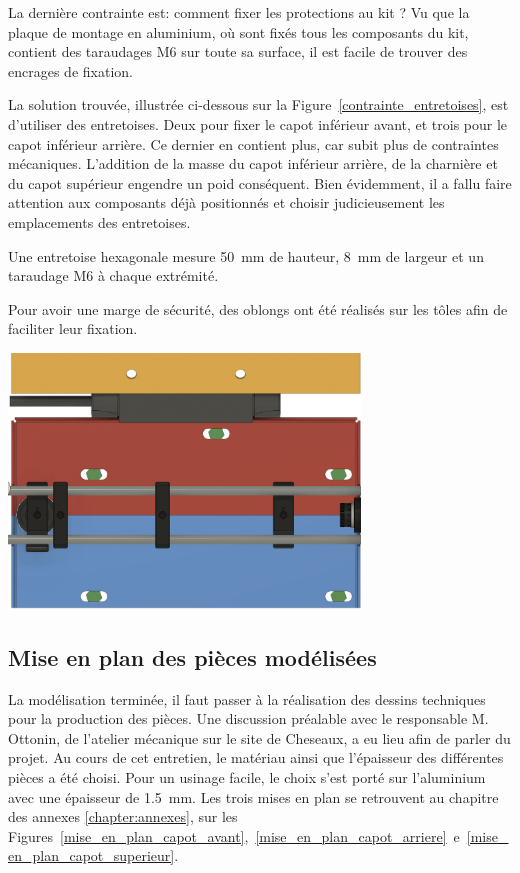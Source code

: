 \begin{minipage}{\textwidth}
    La dernière contrainte est: comment fixer les protections au kit ? Vu que la plaque de montage en aluminium, où sont fixés tous les composants du kit, contient des taraudages M6 sur toute sa surface, il est facile de trouver des encrages de fixation.

    La solution trouvée, illustrée ci-dessous sur la Figure~\ref{contrainte_entretoises}, est d'utiliser des entretoises. Deux pour fixer le capot inférieur avant, et trois pour le capot inférieur arrière. Ce dernier en contient plus, car subit plus de contraintes mécaniques. L'addition de la masse du capot inférieur arrière, de la charnière et du capot supérieur engendre un poid conséquent. Bien évidemment, il a fallu faire attention aux composants déjà positionnés et choisir judicieusement les emplacements des entretoises.

    Une entretoise hexagonale mesure 50~mm de hauteur, 8~mm de largeur et un taraudage M6 à chaque extrémité.

    Pour avoir une marge de sécurité, des oblongs ont été réalisés sur les tôles afin de faciliter leur fixation.
    \vspace{1em}
    \begin{center}
        \includegraphics[width=0.7\textwidth]{assets/figures/Protections_laser/Securite_mecanique/Protection_entree_laser/contrainte_entretoises.jpeg}
    \end{center}
    \label{contrainte_entretoises}
\end{minipage}

\subsection{Mise en plan des pièces modélisées}
La modélisation terminée, il faut passer à la réalisation des dessins techniques pour la production des pièces. Une discussion préalable avec le responsable M. Ottonin, de l'atelier mécanique sur le site de Cheseaux, a eu lieu afin de parler du projet. Au cours de cet entretien, le matériau ainsi que l'épaisseur des différentes pièces a été choisi. Pour un usinage facile, le choix s'est porté sur l'aluminium avec une épaisseur de 1.5~mm. Les trois mises en plan se retrouvent au chapitre des annexes \ref{chapter:annexes}, sur les Figures~\ref{mise_en_plan_capot_avant},~\ref{mise_en_plan_capot_arriere}~e~\ref{mise_en_plan_capot_superieur}.

